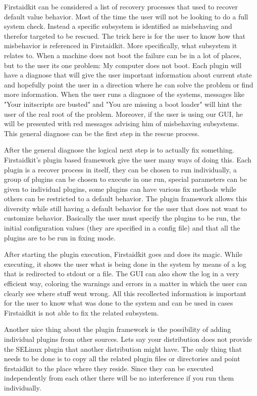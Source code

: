 \documentclass[a4paper,13pt]{article}
\begin{document}
Firstaidkit can be considered a list of recovery processes that used to recover default value behavior.  Most of the time the user will not be looking to do a full system check.  Instead a specific subsystem is identified as misbehaving and therefor targeted to be rescued.  The trick here is for the user to know how that misbehavior is referenced in Firstaidkit.  More specifically, what subsystem it relates to.  When a machine does not boot the failure can be in a lot of places, but to the user its one problem: My computer does not boot.  Each plugin will have a diagnose that will give the user important information about current state and hopefully point the user in a direction where he can solve the problem or find more information.  When the user runs a diagnose of the systems, messages like "Your initscripts are busted" and "You are missing a boot loader" will hint the user of the real root of the problem.  Moreover, if the user is using our GUI, he will be presented with red messages advising him of misbehaving subsystems.  This general diagnose can be the first step in the rescue process.

After the general diagnose the logical next step is to actually fix something.  Firstaidkit's plugin based framework give the user many ways of doing this.  Each plugin is a recover process in itself, they can be chosen to run individually, a group of plugins can be chosen to execute in one run, special parameters can be given to individual plugins, some plugins can have various fix methods while others can be restricted to a default behavior.  The plugin framework allows this diversity while still having a default behavior for the user that does not want to customize behavior.  Basically the user must specify the plugins to be run, the initial configuration values (they are specified in a config file) and that all the plugins are to be run in fixing mode.

After starting the plugin execution, Firstaidkit goes and does its magic.  While executing, it shows the user what is being done in the system by means of a log that is redirected to stdout or a file.  The GUI can also show the log in a very efficient way, coloring the warnings and errors in a matter in which the user can clearly see where stuff went wrong.  All this recollected information is important for the user to know what was done to the system and can be used in cases Firstaidkit is not able to fix the related subsystem.

Another nice thing about the plugin framework is the possibility of adding individual plugins from other sources.  Lets say your distribution does not provide the SELinux plugin that another distribution might have.  The only thing that needs to be done is to copy all the related plugin files or directories and point firstaidkit to the place where they reside.  Since they can be executed independently from each other there will be no interference if you run them individually.
\end{document}
